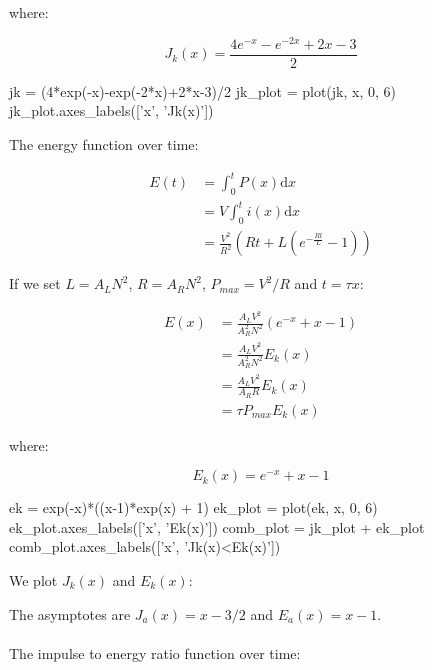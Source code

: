\documentclass[]{elementary-physics}
\begin{document}
where:

\begin{equation}
J_k(x) = \frac{4 e^{-x}-e^{-2x}+2x-3}{2}
\end{equation}

\begin{sagesilent}
jk = (4*exp(-x)-exp(-2*x)+2*x-3)/2
jk_plot = plot(jk, x, 0, 6)
jk_plot.axes_labels(['x', 'Jk(x)'])
\end{sagesilent}

The energy function over time:

\begin{subequations}
\begin{align}
E(t) &= \int^t_0 P(x) \mathrm{d}x \\
&= V \int^t_0 i(x) \mathrm{d}x \\
&= \frac{V^2}{R^2} (R t + L(e^{-\frac{R t}{L}} - 1))
\end{align}
\end{subequations}

If we set $L = A_L N^2$, $R = A_R N^2$, $P_{max} = V^2 / R$ and  $t = \tau x$:

\begin{subequations}
\begin{align}
E(x) &= \frac{A_L V^2}{A_R^2 N^2} (e^{-x}+x-1) \\
&= \frac{A_L V^2}{A_R^2 N^2} E_k(x) \\
&= \frac{A_L V^2}{A_R R} E_k(x) \\
&= \tau P_{max} E_k(x)
\end{align}
\end{subequations}

where:

\begin{equation}
E_k(x) = e^{-x}+x-1
\end{equation}

\begin{sagesilent}
ek = exp(-x)*((x-1)*exp(x) + 1)
ek_plot = plot(ek, x, 0, 6)
ek_plot.axes_labels(['x', 'Ek(x)'])
comb_plot = jk_plot + ek_plot
comb_plot.axes_labels(['x', 'Jk(x)<Ek(x)'])
\end{sagesilent}

We plot $J_k(x)$ and $E_k(x)$:


The asymptotes are $J_a(x) = x-3/2$ and $E_a(x) = x - 1$.\\
\\
The impulse to energy ratio function over time:
\end{document}
